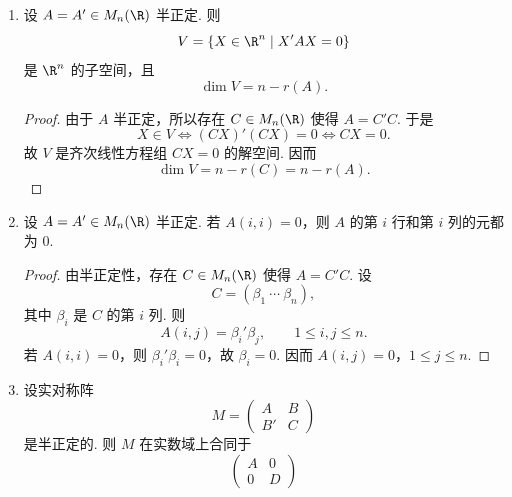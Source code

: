 \begin{example}
\begin{enumerate}
\begin{proof}
			$\Rightarrow$：若 $A$ 半正定，设 $r(A)=r$. 由半正定的规范型，存在可逆的 $P\in M_n(\R)$，使得
			\[
			A=P'
			\begin{pmatrix}
				E_r&0\\
				0&0
			\end{pmatrix}P.
			\]
			又
			\[
			\begin{pmatrix}
				E_r&0\\
				0&0
			\end{pmatrix}
			=
			\begin{pmatrix}
				E_r&0\\
				0&0
			\end{pmatrix}
			\begin{pmatrix}
				E_r&0\\
				0&0
			\end{pmatrix}.
			\]
			令
			\[
			C=\begin{pmatrix}
				E_r&0\\
				0&0
			\end{pmatrix}P,
			\]
			则 $A=C'C$.
		\end{proof}
		\item 设 $A=A'\in M_n(\R)$ 半正定. 则
		\[
		V=\{X\in\R^n\mid X'AX=0\}
		\]
		是 $\R^n$ 的子空间，且
		\[
		\dim V=n-r(A).
		\]
		\begin{proof}
			由于 $A$ 半正定，所以存在 $C\in M_n(\R)$ 使得 $A=C'C$. 于是
			\[
			X\in V\Longleftrightarrow (CX)'(CX)=0\Longleftrightarrow CX=0.
			\]
			故 $V$ 是齐次线性方程组 $CX=0$ 的解空间. 因而
			\[
			\dim V=n-r(C)=n-r(A).
			\]
		\end{proof}
		\item 设 $A=A'\in M_n(\R)$ 半正定. 若 $A(i,i)=0$，则 $A$ 的第 $i$ 行和第 $i$ 列的元都为 $0$.
		\begin{proof}
			由半正定性，存在 $C\in M_n(\R)$ 使得 $A=C'C$. 设
			\[
			C=(\beta_1\ \cdots\ \beta_n),
			\]
			其中 $\beta_i$ 是 $C$ 的第 $i$ 列. 则
			\[
			A(i,j)=\beta_i'\beta_j,
			\qquad 1\leq i,j\leq n.
			\]
			若 $A(i,i)=0$，则 $\beta_i'\beta_i=0$，故 $\beta_i=0$. 因而 $A(i,j)=0$，$1\leq j\leq n$.
		\end{proof}
		\item 设实对称阵
		\[
		M=\begin{pmatrix}
			A&B\\
			B'&C
		\end{pmatrix}
		\]
		是半正定的. 则 $M$ 在实数域上合同于
		\[
		\begin{pmatrix}
			A&0\\
			0&D
		\end{pmatrix}
\]
\end{enumerate}
\end{example}
